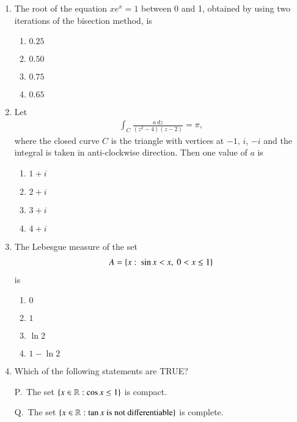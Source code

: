 \documentclass[journal]{IEEEtran}
\numberwithin{equation}{enumi}
\numberwithin{figure}{enumi}
\begin{document}
\begin{enumerate}
\item
The root of the equation $x e^x = 1$ between 0 and 1, obtained by using two iterations of the bisection method, is
\hfill{}
\begin{multicols}{4}
\begin{enumerate}
  \item $0.25$
  \item $0.50$
  \item $0.75$
  \item $0.65$
\end{enumerate}
\end{multicols}

\item
Let
\begin{align}
\int_C \frac{a\,dz}{(z^2-4)(z-2)} = \pi,
\end{align}
where the closed curve $C$ is the triangle with vertices at $-1$, $i$, $-i$ and the integral is taken in anti-clockwise direction. Then one value of $a$ is
\hfill{}
\begin{multicols}{4}
\begin{enumerate}
\item $1+i$
\item $2+i$
\item $3+i$
\item $4+i$
\end{enumerate}
\end{multicols}

\item
The Lebesgue measure of the set
\begin{align}
A = \left\{x:\ \sin x < x,\ 0 < x \leq 1\right\}
\end{align}
is
\hfill{}
\begin{multicols}{4}
\begin{enumerate}
\item $0$
\item $1$
\item $\ln 2$
\item $1 - \ln 2$
\end{enumerate}
\end{multicols}

\item
Which of the following statements are TRUE?

P.\ The set $\left\{x \in \mathbb{R}: \cos x \leq 1\right\}$ is compact.

Q.\ The set $\left\{x \in \mathbb{R}: \tan x \text{ is not differentiable}\right\}$ is complete.


\end{enumerate}
\end{document}
